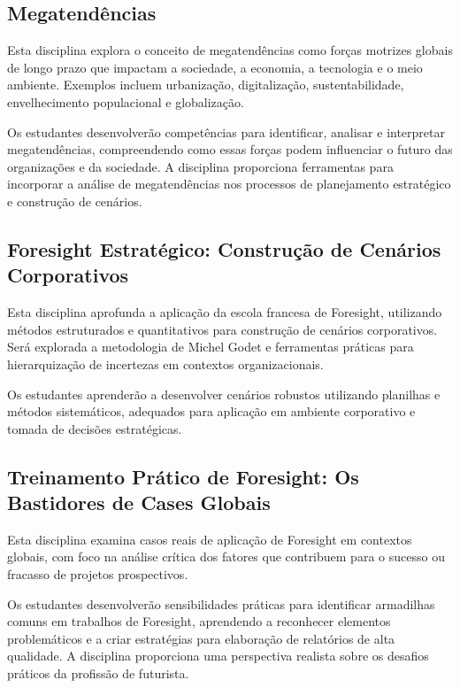 \subsection{Megatendências}

Esta disciplina explora o conceito de megatendências como forças motrizes globais de longo prazo que impactam a sociedade, a economia, a tecnologia e o meio ambiente. Exemplos incluem urbanização, digitalização, sustentabilidade, envelhecimento populacional e globalização.

Os estudantes desenvolverão competências para identificar, analisar e interpretar megatendências, compreendendo como essas forças podem influenciar o futuro das organizações e da sociedade. A disciplina proporciona ferramentas para incorporar a análise de megatendências nos processos de planejamento estratégico e construção de cenários.


\subsection{Foresight Estratégico: Construção de Cenários Corporativos}

Esta disciplina aprofunda a aplicação da escola francesa de Foresight, utilizando métodos estruturados e quantitativos para construção de cenários corporativos. Será explorada a metodologia de Michel Godet e ferramentas práticas para hierarquização de incertezas em contextos organizacionais.

Os estudantes aprenderão a desenvolver cenários robustos utilizando planilhas e métodos sistemáticos, adequados para aplicação em ambiente corporativo e tomada de decisões estratégicas.

\subsection{Treinamento Prático de Foresight: Os Bastidores de Cases Globais}

Esta disciplina examina casos reais de aplicação de Foresight em contextos globais, com foco na análise crítica dos fatores que contribuem para o sucesso ou fracasso de projetos prospectivos. 

Os estudantes desenvolverão sensibilidades práticas para identificar armadilhas comuns em trabalhos de Foresight, aprendendo a reconhecer elementos problemáticos e a criar estratégias para elaboração de relatórios de alta qualidade. A disciplina proporciona uma perspectiva realista sobre os desafios práticos da profissão de futurista.

